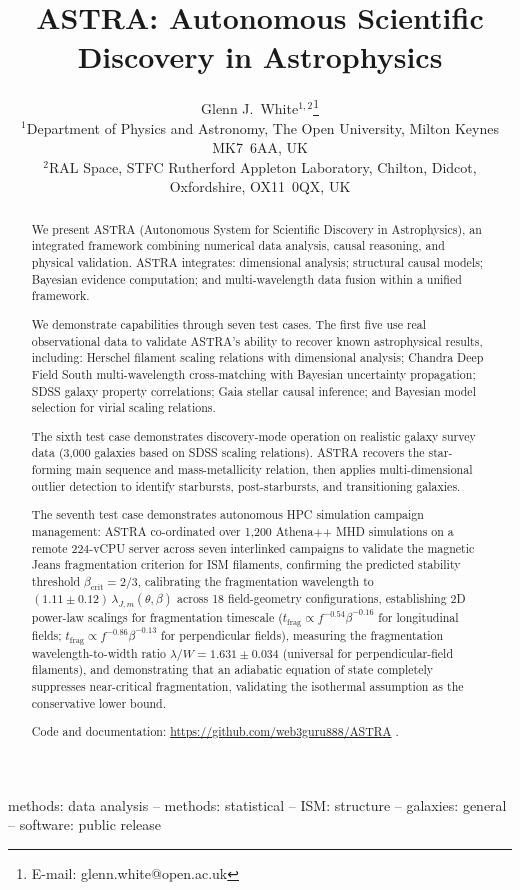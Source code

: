 \documentclass[usenatbib]{rasti}
\title[ASTRA: Autonomous Astrophysical Discovery]{ASTRA: Autonomous Scientific Discovery in Astrophysics}
\author[White]{
Glenn J.~White$^{1,2}$\thanks{E-mail: glenn.white@open.ac.uk}\\
$^{1}$Department of Physics and Astronomy, The Open University, Milton Keynes MK7~6AA, UK\\
$^{2}$RAL Space, STFC Rutherford Appleton Laboratory, Chilton, Didcot, Oxfordshire, OX11~0QX, UK
}
\begin{document}

\maketitle

\label{firstpage}

\begin{keywords}
methods: data analysis -- methods: statistical -- ISM: structure -- galaxies: general -- software: public release
\end{keywords}

\begin{abstract}
We present ASTRA (Autonomous System for Scientific Discovery in Astrophysics), an integrated framework combining numerical data analysis, causal reasoning, and physical validation. ASTRA integrates: dimensional analysis; structural causal models; Bayesian evidence computation; and multi-wavelength data fusion within a unified framework.

We demonstrate capabilities through seven test cases. The first five use real observational data to validate ASTRA's ability to recover known astrophysical results, including: Herschel filament scaling relations with dimensional analysis; Chandra Deep Field South multi-wavelength cross-matching with Bayesian uncertainty propagation; SDSS galaxy property correlations; Gaia stellar causal inference; and Bayesian model selection for virial scaling relations.

The sixth test case demonstrates discovery-mode operation on realistic galaxy survey data (3,000 galaxies based on SDSS scaling relations). ASTRA recovers the star-forming main sequence and mass-metallicity relation, then applies multi-dimensional outlier detection to identify starbursts, post-starbursts, and transitioning galaxies.

The seventh test case demonstrates autonomous HPC simulation campaign management: ASTRA co-ordinated over 1,200 Athena++ MHD simulations on a remote 224-vCPU server across seven interlinked campaigns to validate the magnetic Jeans fragmentation criterion for ISM filaments, confirming the predicted stability threshold $\beta_\mathrm{crit} = 2/3$, calibrating the fragmentation wavelength to $(1.11 \pm 0.12)\,\lambda_{J,m}(\theta,\beta)$ across 18 field-geometry configurations, establishing 2D power-law scalings for fragmentation timescale ($t_\mathrm{frag} \propto f^{-0.54}\beta^{-0.16}$ for longitudinal fields; $t_\mathrm{frag} \propto f^{-0.86}\beta^{-0.13}$ for perpendicular fields), measuring the fragmentation wavelength-to-width ratio $\lambda/W = 1.631 \pm 0.034$ (universal for perpendicular-field filaments), and demonstrating that an adiabatic equation of state completely suppresses near-critical fragmentation, validating the isothermal assumption as the conservative lower bound.

Code and documentation: \url{https://github.com/web3guru888/ASTRA} \citep{astra_github}.
\end{abstract}
\end{document}

